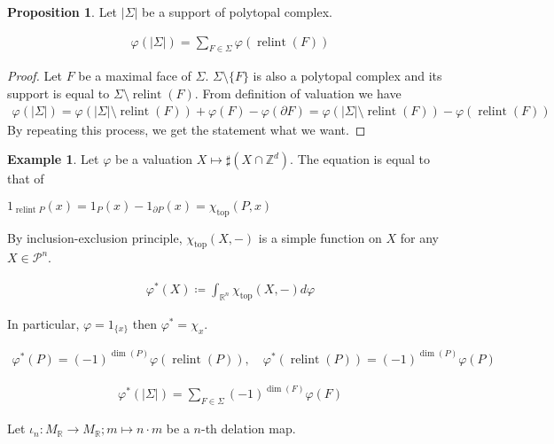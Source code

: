 \documentclass[a4paper,dvipdfmx,reqno,12pt]{amsart}
\theoremstyle{definition}
\newtheorem{Eg}[Thm]{Example}
\newtheorem{Prop}[Thm]{Proposition}
\newcommand{\deq}{\coloneqq}
\newcommand{\R}{\mathbb{R}}%
\newcommand{\Z}{\mathbb{Z}}%
\newcommand{\opn}[1]{\operatorname{#1}}
\numberwithin{equation}{section}
\begin{document}
\begin{Prop}
  Let $|\Sigma|$ be a support of polytopal complex.

  \begin{align}
    \varphi(|\Sigma|)=\sum_{F\in \Sigma}\varphi(\opn{relint}(F))
  \end{align}

\end{Prop}
\begin{proof}
  Let $F$ be a maximal face of $\Sigma$.
  $\Sigma \setminus\{F\}$ is also a polytopal complex and its support
  is equal to $\Sigma \setminus \opn{relint}(F)$. From
  definition of valuation we have
  \begin{align}
    \varphi(|\Sigma|)=\varphi(|\Sigma|\setminus \opn{relint}(F))
    +\varphi(F)-\varphi(\partial F)
    =\varphi(|\Sigma|\setminus \opn{relint}(F))
    -\varphi(\opn{relint}(F))
  \end{align}
  By repeating this process, we get the statement what we want.
\end{proof}

\begin{Eg}
  Let $\varphi$ be a valuation $X\mapsto \sharp (X\cap \Z^{d})$.
  The equation is equal to that of
\end{Eg}





$1_{\opn{relint}P}(x)=1_{P}(x)-1_{\partial P}(x)=\chi_{\opn{top}}(P,x)$

By inclusion-exclusion principle, $\chi_{\opn{top}}(X,-)$ is a
simple function on $X$ for any $X\in \mathscr{P}^{n}$.

\begin{align}
  \varphi^{*}(X)\deq\int_{\R^{n}} \chi_{\opn{top}}(X,-)d\varphi
\end{align}

In particular, $\varphi=1_{\{x\}}$ then $\varphi^{*}=\chi_x$.

\begin{align}
  \varphi^{*}(P)=(-1)^{\dim(P)}\varphi(\opn{relint}(P)),
  \quad \varphi^{*}(\opn{relint}(P))=(-1)^{\dim(P)}\varphi(P)
\end{align}

\begin{align}
  \varphi^{*}(|\Sigma|)=\sum_{F\in \Sigma}(-1)^{\dim(F)}\varphi(F)
\end{align}



Let $\iota_n:M_{\R}\to M_{\R}; m\mapsto n\cdot m$ be a $n$-th delation map.
\end{document}
